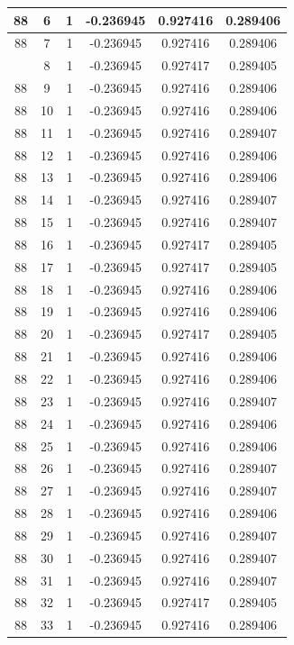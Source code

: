 \documentclass[12pt,a4paper]{article}
\numberwithin{equation}{section}
\numberwithin{figure}{section}
\numberwithin{table}{section}
\begin{document}
\begin{longtable}{|c|c|c|c|c|c|}
88 & 6 & 1 & -0.236945 & 0.927416 & 0.289406 \\ \hline
88 & 7 & 1 & -0.236945 & 0.927416 & 0.289406 \\ \hline
\pagebreak
88 & 8 & 1 & -0.236945 & 0.927417 & 0.289405 \\ \hline
88 & 9 & 1 & -0.236945 & 0.927416 & 0.289406 \\ \hline
88 & 10 & 1 & -0.236945 & 0.927416 & 0.289406 \\ \hline
88 & 11 & 1 & -0.236945 & 0.927416 & 0.289407 \\ \hline
88 & 12 & 1 & -0.236945 & 0.927416 & 0.289406 \\ \hline
88 & 13 & 1 & -0.236945 & 0.927416 & 0.289406 \\ \hline
88 & 14 & 1 & -0.236945 & 0.927416 & 0.289407 \\ \hline
88 & 15 & 1 & -0.236945 & 0.927416 & 0.289407 \\ \hline
88 & 16 & 1 & -0.236945 & 0.927417 & 0.289405 \\ \hline
88 & 17 & 1 & -0.236945 & 0.927417 & 0.289405 \\ \hline
88 & 18 & 1 & -0.236945 & 0.927416 & 0.289406 \\ \hline
88 & 19 & 1 & -0.236945 & 0.927416 & 0.289406 \\ \hline
88 & 20 & 1 & -0.236945 & 0.927417 & 0.289405 \\ \hline
88 & 21 & 1 & -0.236945 & 0.927416 & 0.289406 \\ \hline
88 & 22 & 1 & -0.236945 & 0.927416 & 0.289406 \\ \hline
88 & 23 & 1 & -0.236945 & 0.927416 & 0.289407 \\ \hline
88 & 24 & 1 & -0.236945 & 0.927416 & 0.289406 \\ \hline
88 & 25 & 1 & -0.236945 & 0.927416 & 0.289406 \\ \hline
88 & 26 & 1 & -0.236945 & 0.927416 & 0.289407 \\ \hline
88 & 27 & 1 & -0.236945 & 0.927416 & 0.289407 \\ \hline
88 & 28 & 1 & -0.236945 & 0.927416 & 0.289406 \\ \hline
88 & 29 & 1 & -0.236945 & 0.927416 & 0.289407 \\ \hline
88 & 30 & 1 & -0.236945 & 0.927416 & 0.289407 \\ \hline
88 & 31 & 1 & -0.236945 & 0.927416 & 0.289407 \\ \hline
88 & 32 & 1 & -0.236945 & 0.927417 & 0.289405 \\ \hline
88 & 33 & 1 & -0.236945 & 0.927416 & 0.289406 \\ \hline

\end{longtable}
\end{document}
